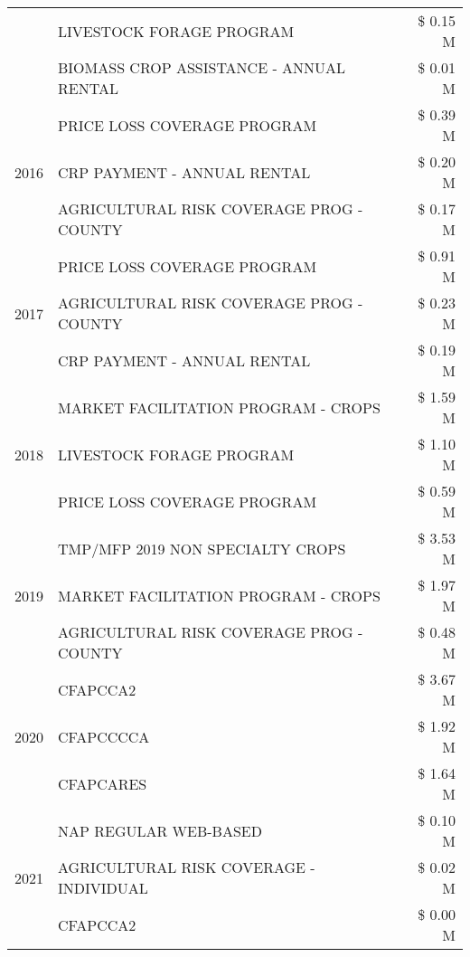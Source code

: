 \begin{tabular}{llr}
 & LIVESTOCK FORAGE PROGRAM & \$ 0.15 M \\
 & BIOMASS CROP ASSISTANCE - ANNUAL RENTAL & \$ 0.01 M \\
\cline{1-3}
\multirow[t]{3}{*}{2016} & PRICE LOSS COVERAGE PROGRAM & \$ 0.39 M \\
 & CRP PAYMENT - ANNUAL RENTAL & \$ 0.20 M \\
 & AGRICULTURAL RISK COVERAGE PROG - COUNTY & \$ 0.17 M \\
\cline{1-3}
\multirow[t]{3}{*}{2017} & PRICE LOSS COVERAGE PROGRAM & \$ 0.91 M \\
 & AGRICULTURAL RISK COVERAGE PROG - COUNTY & \$ 0.23 M \\
 & CRP PAYMENT - ANNUAL RENTAL & \$ 0.19 M \\
\cline{1-3}
\multirow[t]{3}{*}{2018} & MARKET FACILITATION PROGRAM - CROPS & \$ 1.59 M \\
 & LIVESTOCK FORAGE PROGRAM & \$ 1.10 M \\
 & PRICE LOSS COVERAGE PROGRAM & \$ 0.59 M \\
\cline{1-3}
\multirow[t]{3}{*}{2019} & TMP/MFP 2019 NON SPECIALTY CROPS & \$ 3.53 M \\
 & MARKET FACILITATION PROGRAM - CROPS & \$ 1.97 M \\
 & AGRICULTURAL RISK COVERAGE PROG - COUNTY & \$ 0.48 M \\
\cline{1-3}
\multirow[t]{3}{*}{2020} & CFAPCCA2 & \$ 3.67 M \\
 & CFAPCCCCA & \$ 1.92 M \\
 & CFAPCARES & \$ 1.64 M \\
\cline{1-3}
\multirow[t]{3}{*}{2021} & NAP REGULAR WEB-BASED & \$ 0.10 M \\
 & AGRICULTURAL RISK COVERAGE - INDIVIDUAL & \$ 0.02 M \\
 & CFAPCCA2 & \$ 0.00 M \\
\cline{1-3}
\bottomrule
\end{tabular}
